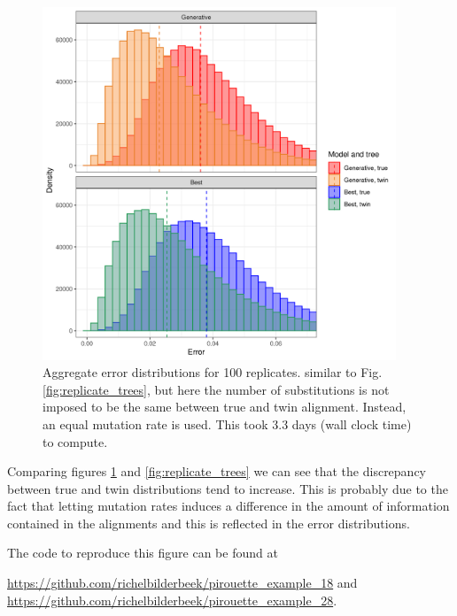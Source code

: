 \begin{figure}[H]
  \includegraphics[width=0.94\textwidth]{pirouette_example_18/errors.png}
  \caption{Aggregate error distributions for 100 replicates.
    similar to Fig. \ref{fig:replicate_trees}, 
    but here the number of substitutions is not imposed 
    to be the same between true and twin alignment. 
    Instead, an equal mutation rate is used. 
    This took 3.3 days (wall clock time) to compute.}
  \label{fig:example_random_mutations}
\end{figure}

Comparing figures \ref{fig:example_random_mutations} 
and \ref{fig:replicate_trees} we can see that the discrepancy between 
true and twin distributions tend to increase. 
This is probably due to the fact that letting mutation rates 
induces a difference in the amount of information contained in the 
alignments and this is reflected in the error distributions.

The code to reproduce this figure can be found at
\begin{sloppypar}
  \url{https://github.com/richelbilderbeek/pirouette_example_18} and
  \url{https://github.com/richelbilderbeek/pirouette_example_28}.
\end{sloppypar}

\newpage

